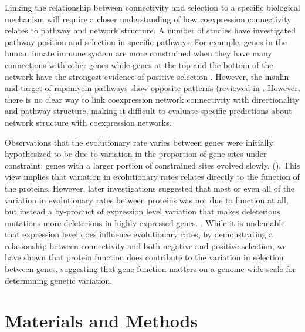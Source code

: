 Linking the relationship between connectivity and selection to a specific biological mechanism will require a closer understanding of how coexpression connectivity relates to pathway and network structure. A number of studies have investigated pathway position and selection in specific pathways. For example, genes in the human innate immune system are more constrained when they have many connections with other genes while genes at the top and the bottom of the network have the strongest evidence of positive selection \citep{Casals2011-jz}. However, the insulin and target of rapamycin pathways show opposite patterns (reviewed in \citep{Olson-Manning2013-op}. However, there is no clear way to link coexpression network connectivity with directionality and pathway structure, making it difficult to evaluate specific predictions about network structure with coexpression networks.

Observations that the evolutionary rate varies between genes were initially hypothesized to be due to variation in the proportion of gene sites under constraint: genes with a larger portion of constrained sites evolved slowly. (\citep{Kimura1977-ib}). This view implies that variation in evolutionary rates relates directly to the function of the proteins. However, later investigations suggested that most or even all of the variation in evolutionary rates between proteins was not due to function at all, but instead a by-product of expression level variation that makes deleterious mutations more deleterious in highly expressed genes. \citep{Drummond2006-pa,Zhang2015-ne}. While it is undeniable that expression level does influence evolutionary rates, by demonstrating a relationship between connectivity and both negative and positive selection, we have shown that protein function does contribute to the variation in selection between genes, suggesting that gene function matters on a genome-wide scale for determining genetic variation. 


\section{Materials and Methods}

